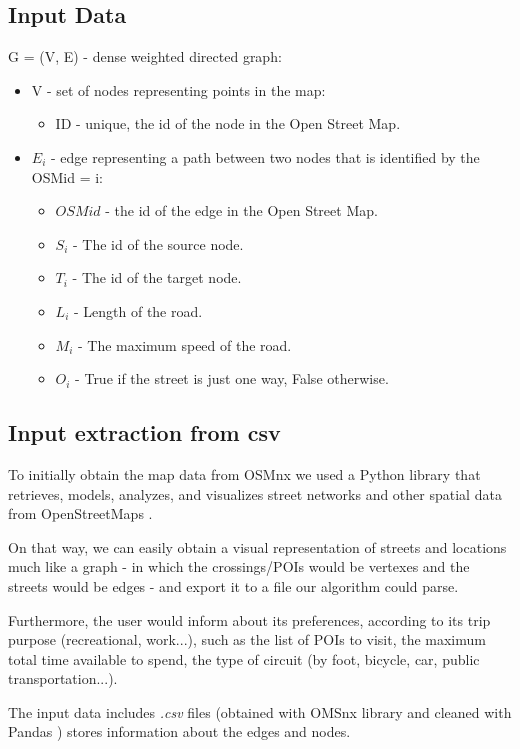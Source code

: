 \documentclass{article}
\begin{document}
\subsection*{Input Data}
G = (V, E) - dense weighted directed graph:
\begin{itemize}
\item V - set of nodes representing points in the map:
    \begin{itemize}
    \item ID - unique, the id of the node in the Open Street Map.
    \end{itemize}

\item $E_i$ - edge representing a path between two nodes that is identified by the OSMid = i:
    \begin{itemize}
    \item $OSM id$ - the id of the edge in the Open Street Map. 
    \item $S_i$ - The id of the source node.
    \item $T_i$ - The id of the target node.
    \item $L_i$ - Length of the road.
    \item $M_i$ - The maximum speed of the road.
    \item $O_i$ - True if the street is just one way, False otherwise.
    \end{itemize}
\end{itemize}

\subsection*{Input extraction from csv}
To initially obtain the map data from OSMnx \cite{OSMnx} we used a Python library that retrieves, models, analyzes, and visualizes street networks and other spatial data from OpenStreetMaps \cite{OpenStreetMaps}. \par
On that way, we can easily obtain a visual representation of streets and locations much like a graph - in which the crossings/POIs would be vertexes and the streets would be edges - and export it to a file our algorithm could parse. \par
Furthermore, the user would inform about its preferences, according to its trip purpose (recreational, work...), such as the list of POIs to visit, the maximum total time available to spend, the type of circuit (by foot, bicycle, car, public transportation...).

The input data includes \textit{.csv} files (obtained with OMSnx library \cite{OSMnx} and cleaned with Pandas \cite{Pandas}) stores information about the edges and nodes. \newline
\end{document}
